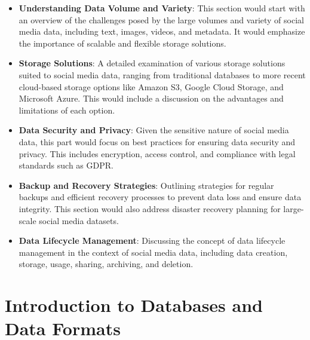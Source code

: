 \documentclass[
]{book}
\providecommand{\tightlist}{%
  \setlength{\itemsep}{0pt}\setlength{\parskip}{0pt}}
\begin{document}
\begin{itemize}
\tightlist
\item
  \textbf{Understanding Data Volume and Variety}: This section would start with an overview of the challenges posed by the large volumes and variety of social media data, including text, images, videos, and metadata. It would emphasize the importance of scalable and flexible storage solutions.
\item
  \textbf{Storage Solutions}: A detailed examination of various storage solutions suited to social media data, ranging from traditional databases to more recent cloud-based storage options like Amazon S3, Google Cloud Storage, and Microsoft Azure. This would include a discussion on the advantages and limitations of each option.
\item
  \textbf{Data Security and Privacy}: Given the sensitive nature of social media data, this part would focus on best practices for ensuring data security and privacy. This includes encryption, access control, and compliance with legal standards such as GDPR.
\item
  \textbf{Backup and Recovery Strategies}: Outlining strategies for regular backups and efficient recovery processes to prevent data loss and ensure data integrity. This section would also address disaster recovery planning for large-scale social media datasets.
\item
  \textbf{Data Lifecycle Management}: Discussing the concept of data lifecycle management in the context of social media data, including data creation, storage, usage, sharing, archiving, and deletion.
\end{itemize}

\hypertarget{introduction-to-databases-and-data-formats}{%
\section*{Introduction to Databases and Data Formats}\label{introduction-to-databases-and-data-formats}}
\end{document}
